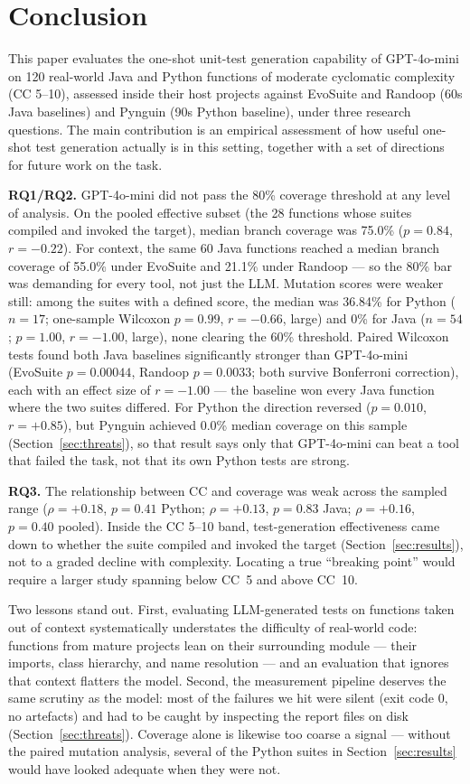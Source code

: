 \section{Conclusion}\label{sec:conclusion}

This paper evaluates the one-shot unit-test generation capability of GPT-4o-mini on 120
real-world Java and Python functions of moderate cyclomatic complexity (CC 5--10),
assessed inside their host projects against EvoSuite and Randoop (60s Java baselines) and
Pynguin (90s Python baseline), under three research questions. The main contribution is an
empirical assessment of how useful one-shot test generation actually is in this setting,
together with a set of directions for future work on the task.

\textbf{RQ1/RQ2.} GPT-4o-mini did not pass the 80\% coverage threshold at any level of
analysis. On the pooled effective subset (the 28 functions whose suites compiled and
invoked the target), median branch coverage was 75.0\% ($p=0.84$, $r=-0.22$). For context,
the same 60 Java functions reached a median branch coverage of 55.0\% under EvoSuite and
21.1\% under Randoop --- so the 80\% bar was demanding for every tool, not just the LLM.
Mutation scores were weaker still: among the suites with a defined score, the median was
36.84\% for Python ($n=17$; one-sample Wilcoxon $p=0.99$, $r=-0.66$, large) and 0\% for
Java ($n=54$; $p=1.00$, $r=-1.00$, large), none clearing the 60\% threshold.
Paired Wilcoxon tests found both Java baselines significantly stronger than GPT-4o-mini
(EvoSuite $p=0.00044$, Randoop $p=0.0033$; both survive Bonferroni correction), each with an effect size of $r=-1.00$ --- the
baseline won every Java function where the two suites differed. For Python the direction
reversed ($p=0.010$, $r=+0.85$), but Pynguin achieved 0.0\% median coverage on this sample
(Section~\ref{sec:threats}), so that result says only that GPT-4o-mini can beat a tool that
failed the task, not that its own Python tests are strong.

\textbf{RQ3.} The relationship between CC and coverage was weak across the sampled range
($\rho=+0.18$, $p=0.41$ Python; $\rho=+0.13$, $p=0.83$ Java; $\rho=+0.16$, $p=0.40$
pooled). Inside the CC 5--10 band, test-generation effectiveness came down to whether the
suite compiled and invoked the target (Section~\ref{sec:results}), not to a graded decline
with complexity. Locating a true ``breaking point'' would require a larger study spanning
below CC~5 and above CC~10.

Two lessons stand out. First, evaluating LLM-generated tests on functions taken out of
context systematically understates the difficulty of real-world code: functions from
mature projects lean on their surrounding module --- their imports, class hierarchy, and
name resolution --- and an evaluation that ignores that context flatters the model.
Second, the measurement pipeline deserves the same scrutiny as the model: most of the
failures we hit were silent (exit code 0, no artefacts) and had to be caught by inspecting
the report files on disk (Section~\ref{sec:threats}). Coverage alone is likewise too coarse
a signal --- without the paired mutation analysis, several of the Python suites in
Section~\ref{sec:results} would have looked adequate when they were not.

